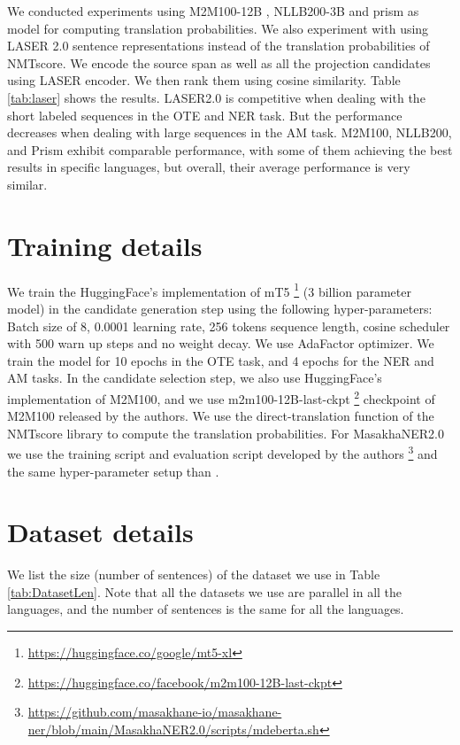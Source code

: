 \documentclass[11pt]{article}
\begin{document}
We conducted experiments using M2M100-12B \cite{DBLP:journals/jmlr/FanBSMEGBCWCGBL21}, NLLB200-3B \cite{DBLP:journals/corr/abs-2207-04672} and prism
\cite{DBLP:conf/emnlp/ThompsonP20} as model for computing translation probabilities. We also experiment with using LASER 2.0 \cite{DBLP:journals/tacl/ArtetxeS19} sentence representations instead of the translation probabilities of NMTscore. We encode the source span as well as all the projection candidates using LASER encoder. We then rank them using cosine similarity. Table \ref{tab:laser} shows the results. LASER2.0 is competitive when dealing with the short labeled sequences in the OTE and NER task. But the performance decreases when dealing with large sequences in the AM task. M2M100, NLLB200, and Prism exhibit comparable performance, with some of them achieving the best results in specific languages, but overall, their average performance is very similar.


\section{Training details}
\label{sec:trainingDetails}
We train the HuggingFace's \cite{DBLP:journals/corr/abs-1910-03771}  implementation of mT5  \footnote{\url{https://huggingface.co/google/mt5-xl}} (3 billion parameter model) in the candidate generation step using the following hyper-parameters: Batch size of 8, 0.0001 learning rate, 256 tokens sequence length, cosine scheduler with 500 warn up steps and no weight decay. We use AdaFactor \cite{DBLP:conf/icml/ShazeerS18} optimizer. We train the model for 10 epochs in the OTE task, and 4 epochs for the NER and AM tasks. 
In the candidate selection step, we also use HuggingFace's implementation of M2M100, and we use m2m100-12B-last-ckpt \footnote{\url{https://huggingface.co/facebook/m2m100-12B-last-ckpt}} checkpoint of M2M100 released by the authors. We use the direct-translation function of the NMTscore library to compute the translation probabilities. 
For MasakhaNER2.0 we use the training script and evaluation script developed by the authors \footnote{\url{https://github.com/masakhane-io/masakhane-ner/blob/main/MasakhaNER2.0/scripts/mdeberta.sh}} and the same hyper-parameter setup than \citet{DBLP:journals/corr/abs-2211-15613}. 

\section{Dataset details}
\label{sec:DatasetDetails}
We list the size (number of sentences) of the dataset we use in Table \ref{tab:DatasetLen}. Note that all the datasets we use are parallel in all the languages, and the number of sentences is the same for all the languages. 
\end{document}
